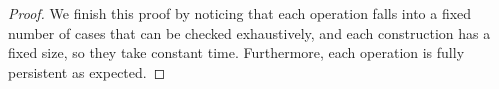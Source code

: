 \begin{proof}
We finish this proof by noticing that each operation falls into a fixed number of cases that can be checked exhaustively, and each construction has a fixed size, so they take constant time. 
Furthermore, each operation is fully persistent as expected.





%	
%	
%
%	
%	
%	
%	
%	

\end{proof}
